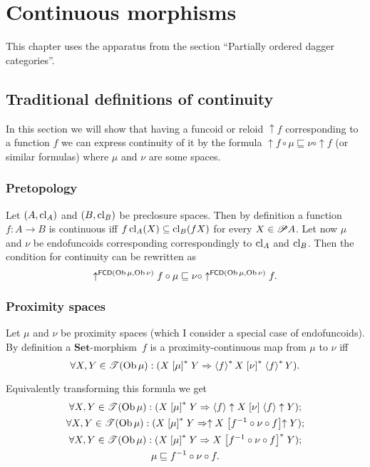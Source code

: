 
\chapter{Continuous morphisms}

This chapter uses the apparatus from the section ``Partially ordered
dagger categories''.


\section{Traditional definitions of continuity}

In this section we will show that having a funcoid or reloid $\uparrow f$
corresponding to a function $f$ we can express continuity of it by
the formula $\uparrow f\circ\mu\sqsubseteq\nu\circ\uparrow f$ (or
similar formulas) where $\mu$ and $\nu$ are some spaces.


\subsection{Pretopology}

Let $(A,\operatorname{cl}_{A})$ and $(B,\operatorname{cl}_{B})$ be preclosure spaces. Then by
definition a function $f:A\rightarrow B$ is continuous iff $f\operatorname{cl}_{A}(X)\subseteq\operatorname{cl}_{B}(fX)$
for every $X\in\mathscr{P} A$. Let now $\mu$ and $\nu$ be endofuncoids
corresponding correspondingly to $\operatorname{cl}_{A}$ and $\operatorname{cl}_{B}$. Then the
condition for continuity can be rewritten as
\[
\uparrow^{\mathsf{FCD}(\operatorname{Ob}\mu,\operatorname{Ob}\nu)}f\circ\mu\sqsubseteq\nu\circ\uparrow^{\mathsf{FCD}(\operatorname{Ob}\mu,\operatorname{Ob}\nu)}f.
\]



\subsection{Proximity spaces}

Let $\mu$ and $\nu$ be proximity spaces (which I consider a special
case of endofuncoids). By definition a $\mathbf{Set}$-morphism~$f$
is a proximity-continuous map from $\mu$
to $\nu$ iff
\[
\forall X,Y\in\mathscr{T}(\operatorname{Ob}\mu):(X\mathrel{\left[\mu\right]^{\ast}}Y\Rightarrow\left\langle f\right\rangle ^{\ast}X\mathrel{\left[\nu\right]^{\ast}}\left\langle f\right\rangle ^{\ast}Y).
\]


Equivalently transforming this formula we get
\begin{gather*}
\forall X,Y\in\mathscr{T}(\operatorname{Ob}\mu):(X\mathrel{\left[\mu\right]^{\ast}}Y\Rightarrow\left\langle f\right\rangle\uparrow X\mathrel{\left[\nu\right]}\left\langle f\right\rangle\uparrow Y);\\
\forall X,Y\in\mathscr{T}(\operatorname{Ob}\mu):(X\mathrel{\left[\mu\right]^{\ast}}Y\Rightarrow\uparrow X\mathrel{\left[f^{-1}\circ\nu\circ f\right]}\uparrow Y);\\
\forall X,Y\in\mathscr{T}(\operatorname{Ob}\mu):(X\mathrel{\left[\mu\right]^{\ast}}Y\Rightarrow X\mathrel{\left[f^{-1}\circ\nu\circ f\right]^{\ast}}Y);\\
\mu\sqsubseteq f^{-1}\circ\nu\circ f.
\end{gather*}


